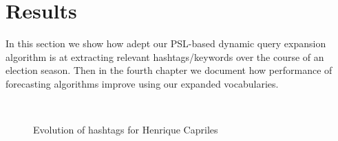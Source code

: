\section{Results}
In this section we show how adept our PSL-based dynamic query expansion algorithm is at extracting relevant hashtags/keywords over the course of an election season.
Then in the fourth chapter we document how performance of forecasting algorithms improve using our expanded vocabularies.
\begin{figure}
	\centering
	 \\
	\noindent 
	\caption{Evolution of hashtags for Henrique Capriles} 
	\label{fig:wordCloud}
\end{figure}

